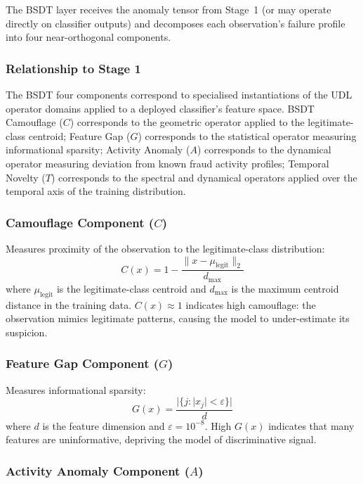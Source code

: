 \documentclass[12pt,a4paper]{article}
\begin{document}
The BSDT layer receives the anomaly tensor from Stage~1 (or may operate
directly on classifier outputs) and decomposes each observation's failure
profile into four near-orthogonal components.

\subsubsection{Relationship to Stage 1}

The BSDT four components correspond to specialised instantiations of the
UDL operator domains applied to a deployed classifier's feature space.
BSDT Camouflage ($C$) corresponds to the geometric operator applied to
the legitimate-class centroid; Feature Gap ($G$) corresponds to the
statistical operator measuring informational sparsity; Activity Anomaly
($A$) corresponds to the dynamical operator measuring deviation from known
fraud activity profiles; Temporal Novelty ($T$) corresponds to the spectral
and dynamical operators applied over the temporal axis of the training
distribution.

\subsubsection{Camouflage Component ($C$)}

Measures proximity of the observation to the legitimate-class distribution:
\begin{equation}
C(x) = 1 - \frac{\|x-\mu_{\mathrm{legit}}\|_2}{d_{\max}}
\end{equation}
where $\mu_{\mathrm{legit}}$ is the legitimate-class centroid and
$d_{\max}$ is the maximum centroid distance in the training data.
$C(x)\approx 1$ indicates high camouflage: the observation mimics
legitimate patterns, causing the model to under-estimate its suspicion.

\subsubsection{Feature Gap Component ($G$)}

Measures informational sparsity:
\begin{equation}
G(x) = \frac{|\{j : |x_j|<\varepsilon\}|}{d}
\end{equation}
where $d$ is the feature dimension and $\varepsilon=10^{-8}$.
High $G(x)$ indicates that many features are uninformative, depriving the
model of discriminative signal.

\subsubsection{Activity Anomaly Component ($A$)}
\end{document}
